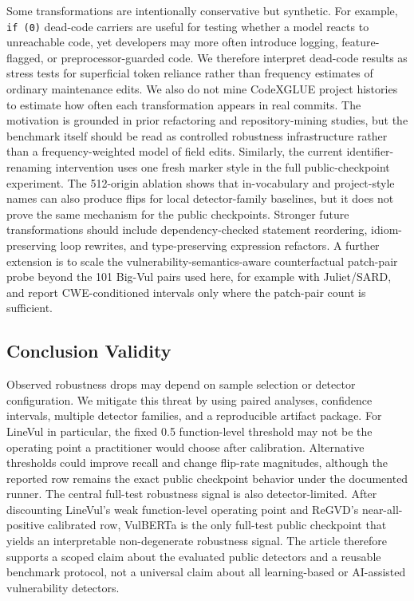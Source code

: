 \documentclass[a4paper,fleqn]{cas-dc}
\begin{document}
Some transformations are intentionally conservative but synthetic. For
example, \texttt{if (0)} dead-code carriers are useful for testing whether a
model reacts to unreachable code, yet developers may more often introduce
logging, feature-flagged, or preprocessor-guarded code. We therefore interpret
dead-code results as stress tests for superficial token reliance rather than
frequency estimates of ordinary maintenance edits.
We also do not mine CodeXGLUE project histories to estimate how often each
transformation appears in real commits. The motivation is grounded in prior
refactoring and repository-mining studies, but the benchmark itself should be
read as controlled robustness infrastructure rather than a frequency-weighted
model of field edits.
Similarly, the current identifier-renaming intervention uses one fresh marker
style in the full public-checkpoint experiment. The 512-origin ablation shows
that in-vocabulary and project-style names can also produce flips for local
detector-family baselines, but it does not prove the same mechanism for the
public checkpoints. Stronger future transformations should include
dependency-checked statement reordering, idiom-preserving loop rewrites, and
type-preserving expression refactors. A further extension is to scale the
vulnerability-semantics-aware counterfactual patch-pair probe beyond the 101
Big-Vul pairs used here, for example with Juliet/SARD, and report
CWE-conditioned intervals only where the patch-pair count is sufficient.

\subsection{Conclusion Validity}

Observed robustness drops may depend on sample selection or detector
configuration. We mitigate this threat by using paired analyses, confidence
intervals, multiple detector families, and a reproducible artifact package.
For LineVul in particular, the fixed 0.5 function-level threshold may not be
the operating point a practitioner would choose after calibration. Alternative
thresholds could improve recall and change flip-rate magnitudes, although the
reported row remains the exact public checkpoint behavior under the documented
runner.
The central full-test robustness signal is also detector-limited. After
discounting LineVul's weak function-level operating point and ReGVD's
near-all-positive calibrated row, VulBERTa is the only full-test public
checkpoint that yields an interpretable non-degenerate robustness signal. The
article therefore supports a scoped claim about the evaluated public detectors
and a reusable benchmark protocol, not a universal claim about all
learning-based or AI-assisted vulnerability detectors.
\end{document}
